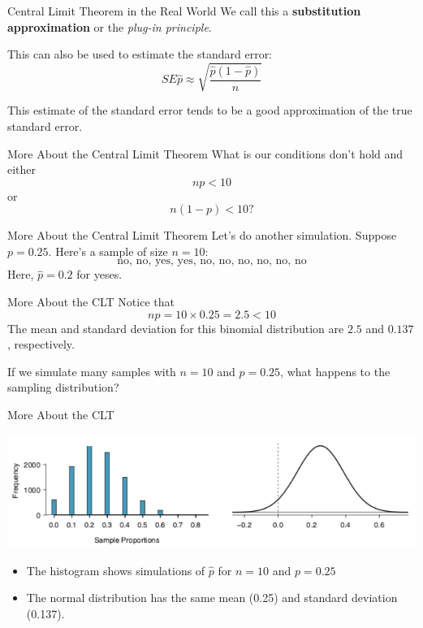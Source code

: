 \begin{frame}{Central Limit Theorem in the Real World}
    We call this a \textbf{substitution approximation} or the \textit{plug-in principle}. 
    
    \vspace{12pt}This can also be used to estimate the standard error:
    \[
        SE{\hat{p}} \approx \sqrt{\frac{\hat{p}(1-\hat{p})}{n}}
    \]
    
    \vspace{12pt}This estimate of the standard error tends to be a good approximation of the true standard error.
\end{frame}

\begin{frame}{More About the Central Limit Theorem}
    What is our conditions don't hold and either
    \[
        np < 10
    \]
    or 
    \[
        n(1-p) < 10?
    \]
\end{frame}

\begin{frame}{More About the Central Limit Theorem}
    Let's do another simulation. Suppose $p=0.25$. Here’s a sample of size $n=10$:
    \[
        \text{no, no, yes, yes, no, no, no, no, no, no}
    \]
    Here, $\hat{p}=0.2$ for yeses. 
\end{frame}

\begin{frame}{More About the CLT}
    Notice that
    \[
        np = 10\times0.25=2.5 < 10
    \]
    The mean and standard deviation for this binomial distribution are $2.5$ and $0.137$, respectively.
    
    \vspace{12pt}If we simulate many samples with $n=10$ and $p=0.25$, what happens to the sampling distribution?
\end{frame}

\begin{frame}{More About the CLT}
    \begin{center}
        \includegraphics[scale=0.5]{images/sampdist2.png}
    \end{center}
    \begin{itemize}
        \item The histogram shows simulations of $\hat{p}$ for $n=10$ and $p=0.25$
        \item The normal distribution has the same mean (0.25) and standard deviation (0.137).
    \end{itemize}
\end{frame}

